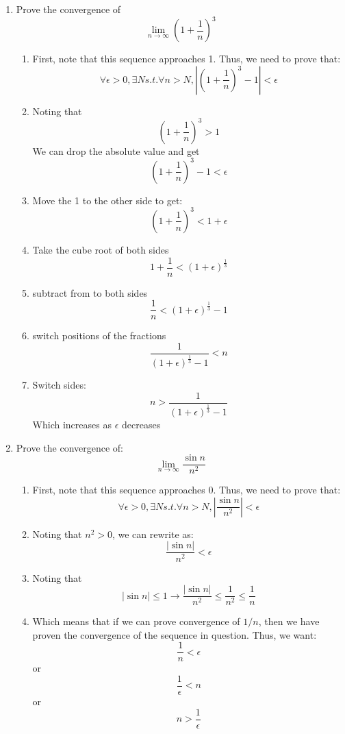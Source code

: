 \documentclass{article}
\begin{document}
\begin{enumerate}
\begin{enumerate}
    \end{enumerate}
    \newpage
    \item Prove the convergence of $$\lim_{n\rightarrow \infty} \left(1+\frac{1}{n}\right)^{3}$$
    \begin{enumerate}
        \item First, note that this sequence approaches 1. Thus, we need to prove that:
            $$\forall \epsilon > 0,  \exists N s.t. \forall n > N, \left| \left(1+\frac{1}{n}\right)^{3} - 1\right| < \epsilon$$
        \item Noting that 
        $$\left(1+\frac{1}{n}\right)^{3} > 1$$
        We can drop the absolute value and get
        $$\left(1+\frac{1}{n}\right)^{3} - 1 < \epsilon$$
        \item Move the 1 to the other side to get:
        $$\left(1+\frac{1}{n}\right)^{3} < 1+ \epsilon$$
        \item Take the cube root of both sides
        $$1+\frac{1}{n} < \left(1+ \epsilon\right) ^{\frac{1}{3}}$$
        \item subtract from to both sides
        $$\frac{1}{n} < \left(1+ \epsilon\right) ^{\frac{1}{3}} -1$$
        \item switch positions of the fractions
        $$\frac{1}{\left(1+ \epsilon\right) ^{\frac{1}{3}} -1} < n$$
        \item Switch sides:
        $$n > \frac{1}{\left(1+ \epsilon\right) ^{\frac{1}{3}} -1}$$
        Which increases as $\epsilon$ decreases
        
    \end{enumerate}
    \newpage
    \item Prove the convergence of: 
    $$\lim_{n\rightarrow \infty} \frac{\sin n}{n^{2}}$$
        \begin{enumerate}
        \item First, note that this sequence approaches 0. Thus, we need to prove that:
            $$\forall \epsilon > 0,  \exists N s.t. \forall n > N, \left|\frac{\sin n}{n^{2}}\right| < \epsilon$$
            \item Noting that $n^2 > 0$, we can rewrite as: 
            $$ \frac{\left|\sin n\right|}{n^{2}} < \epsilon$$
            \item Noting that 
            $$\left|\sin n\right| \leq 1 \rightarrow \frac{\left|\sin n\right|}{n^{2}} \leq \frac{1}{n^2} \leq \frac{1}{n} $$
            \item Which means that if we can prove convergence of $1/n$, then we have proven the convergence of the sequence in question. Thus, we want:
            $$\frac{1}{n} < \epsilon$$
            or
            $$\frac{1}{\epsilon} < n$$
            or
            $$n > \frac{1}{\epsilon}$$


\end{enumerate}
\end{enumerate}
\end{document}
